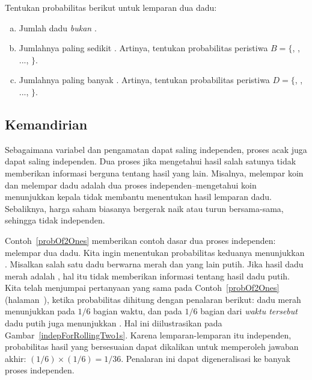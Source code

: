 \begin{exercisewrap}
\begin{nexercise}
Tentukan probabilitas berikut untuk lemparan dua dadu:\footnotemark
\begin{enumerate}[(a)]
\setlength{\itemsep}{0mm}
\item Jumlah dadu \emph{bukan} .
\item Jumlahnya paling sedikit .
    Artinya, tentukan probabilitas peristiwa
    $B = \{$, , ..., $\}$.
\item Jumlahnya paling banyak .
    Artinya, tentukan probabilitas peristiwa
    $D=\{$, , ..., $\}$.
\end{enumerate}
\end{nexercise}
\end{exercisewrap}


\subsection{Kemandirian}
\label{probabilityIndependence}

Sebagaimana variabel dan pengamatan dapat saling independen, proses acak juga dapat saling independen. Dua proses  jika mengetahui hasil salah satunya tidak memberikan informasi berguna tentang hasil yang lain. Misalnya, melempar koin dan melempar dadu adalah dua proses independen--mengetahui koin menunjukkan kepala tidak membantu menentukan hasil lemparan dadu. Sebaliknya, harga saham biasanya bergerak naik atau turun bersama-sama, sehingga tidak independen.

Contoh~\ref{probOf2Ones} memberikan contoh dasar dua proses independen: melempar dua dadu. Kita ingin menentukan probabilitas keduanya menunjukkan . Misalkan salah satu dadu berwarna merah dan yang lain putih. Jika hasil dadu merah adalah , hal itu tidak memberikan informasi tentang hasil dadu putih. Kita telah menjumpai pertanyaan yang sama pada Contoh~\ref{probOf2Ones} (halaman~\pageref{probOf2Ones}), ketika probabilitas dihitung dengan penalaran berikut: dadu merah menunjukkan  pada $1/6$ bagian waktu, dan pada $1/6$ bagian dari \emph{waktu tersebut} dadu putih juga menunjukkan . Hal ini diilustrasikan pada Gambar~\ref{indepForRollingTwo1s}. Karena lemparan-lemparan itu independen, probabilitas hasil yang bersesuaian dapat dikalikan untuk memperoleh jawaban akhir: $(1/6)\times(1/6)=1/36$. Penalaran ini dapat digeneralisasi ke banyak proses independen.


